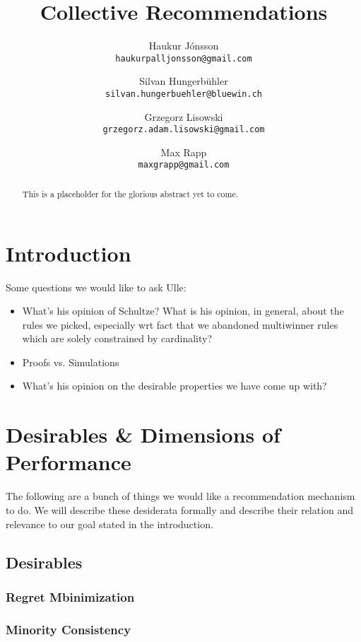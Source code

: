 \documentclass{article}
\title{Collective Recommendations}
\author{
    Haukur J{\'o}nsson \\    \texttt{haukurpalljonsson@gmail.com}
    \and
    Silvan Hungerb{\"u}hler \\   \texttt{silvan.hungerbuehler@bluewin.ch}
    \and
    Grzegorz Lisowski \\  \texttt{grzegorz.adam.lisowski@gmail.com}
    \and
    Max Rapp \\  \texttt{maxgrapp@gmail.com}
}
\begin{document}
\maketitle

\begin{abstract}
This is a placeholder for the glorious abstract yet to come.
\end{abstract}

\section{Introduction}\label{introduction}
Some questions we would like to ask Ulle:
\begin{itemize}
\item What's his opinion of Schultze? What is his opinion, in general, about the rules we picked, especially wrt fact that we abandoned multiwinner rules which are solely constrained by cardinality?
\item Proofs vs. Simulations
\item  What's his opinion on the desirable properties we have come up with?
\end{itemize}






\section{Desirables \& Dimensions of Performance}\label{desirables}
The following are a bunch of things we would like a recommendation mechanism to do.
We will describe these desiderata formally and describe their relation and relevance to our goal stated in the introduction.
\subsection{Desirables}
\subsubsection{Regret Mbinimization}
\subsubsection{Minority Consistency}
\end{document}
